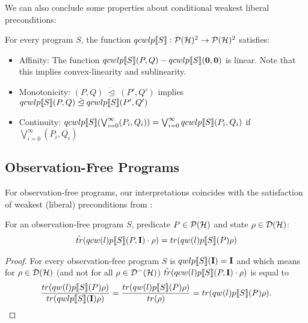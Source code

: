 \documentclass[a4paper,UKenglish,cleveref, autoref, thm-restate]{lipics-v2021}
\begin{document}
We can also conclude some properties about conditional weakest liberal preconditions:
\begin{proposition} \label{prop:healthcwlp}
    For every program $S$, the function $qcwlp\llbracket S \rrbracket:\mathcal{P}(\mathcal{H})^2 \to \mathcal{P}(\mathcal{H})^2$ satisfies:
    \begin{itemize}
        \item Affinity: The function $qcwlp\llbracket S \rrbracket (P,Q) - qcwlp\llbracket S \rrbracket (\mathbf{0},\mathbf{0})$ is linear. Note that this implies convex-linearity and sublinearity.
        \item Monotonicity: $(P,Q) \phantom{.}\dot \unlhd \phantom{.} (P',Q')$ implies $qcwlp\llbracket S \rrbracket (P,Q)\phantom{.}\dot \unlhd \phantom{.}qcwlp\llbracket S \rrbracket (P',Q')$
        \item Continuity: $qcwlp\llbracket S \rrbracket (\bigvee_{i=0}^\infty (P_i,Q_i)) = \bigvee_{i=0}^\infty qcwlp\llbracket S \rrbracket (P_i,Q_i)$ if $\bigvee_{i=0}^\infty (P_i,Q_i)$
    \end{itemize}
\end{proposition}

\subsection{Observation-Free Programs}
For observation-free programs, our interpretations coincides with the satisfaction of weakest (liberal) preconditions from \cite{floydHoareLogic}:
\begin{lemma}
    For an observation-free program $S$, predicate $P\in \mathcal{P}(\mathcal{H})$ and state $\rho \in \mathcal{D}(\mathcal{H})$:
    \begin{align*}
        \hat{tr}(qcw(l)p\llbracket S \rrbracket (P,\textbf{I}) \cdot \rho)= tr(qw(l)p\llbracket S \rrbracket (P)\rho)
\end{align*}
\end{lemma}
\begin{proof}
    For every observation-free program $S$ is $qwlp\llbracket S \rrbracket (\textbf{I}) = \textbf{I}$ \cite{floydHoareLogic} and which means for $\rho \in \mathcal{D}(\mathcal{H})$ (and not for all $\rho \in \mathcal{D}^- (\mathcal{H})$) $\hat{tr}(qcw(l)p\llbracket S \rrbracket (P,\textbf{I}) \cdot \rho)$ is equal to
    \begin{align*}
        \frac{tr(qw(l)p\llbracket S \rrbracket (P)\rho)}{tr(qwlp\llbracket S \rrbracket (\textbf{I})\rho)} = \frac{tr(qw(l)p\llbracket S \rrbracket (P)\rho)}{tr(\rho)} = tr(qw(l)p\llbracket S \rrbracket (P)\rho).
    \end{align*}
\end{proof}
\end{document}
